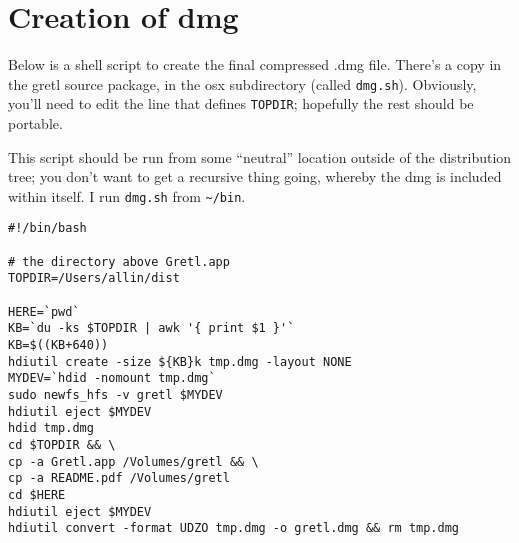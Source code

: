 \documentclass{article}
\begin{document}
\section{Creation of dmg}

Below is a shell script to create the final compressed .dmg file.
There's a copy in the gretl source package, in the osx subdirectory
(called \texttt{dmg.sh}).  Obviously, you'll need to edit the line
that defines \texttt{TOPDIR}; hopefully the rest should be portable.

This script should be run from some ``neutral'' location outside of
the distribution tree; you don't want to get a recursive thing going,
whereby the dmg is included within itself.  I run \texttt{dmg.sh} from
\verb+~/bin+.

\begin{verbatim}
#!/bin/bash

# the directory above Gretl.app
TOPDIR=/Users/allin/dist

HERE=`pwd`
KB=`du -ks $TOPDIR | awk '{ print $1 }'`
KB=$((KB+640))
hdiutil create -size ${KB}k tmp.dmg -layout NONE
MYDEV=`hdid -nomount tmp.dmg`
sudo newfs_hfs -v gretl $MYDEV
hdiutil eject $MYDEV
hdid tmp.dmg
cd $TOPDIR && \
cp -a Gretl.app /Volumes/gretl && \
cp -a README.pdf /Volumes/gretl
cd $HERE
hdiutil eject $MYDEV
hdiutil convert -format UDZO tmp.dmg -o gretl.dmg && rm tmp.dmg

\end{verbatim}
\end{document}
